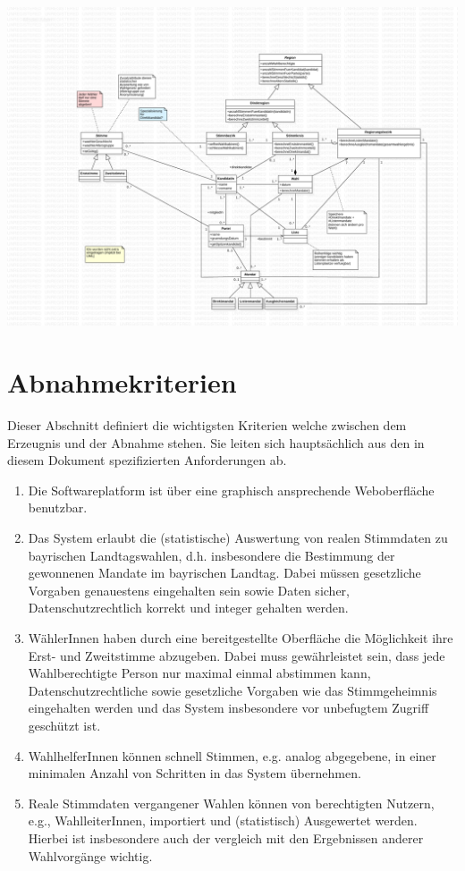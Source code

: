 \documentclass[a4paper,12pt]{article}
\begin{document}
\begin{center}
	\includegraphics[width=\textwidth]{../model.pdf}
\end{center}

\section{Abnahmekriterien}
Dieser Abschnitt definiert die wichtigsten Kriterien welche zwischen dem Erzeugnis und der Abnahme stehen.
Sie leiten sich hauptsächlich aus den in diesem Dokument spezifizierten Anforderungen ab.

\begin{enumerate}
  \item Die Softwareplatform ist über eine graphisch ansprechende Weboberfläche benutzbar.
  \item Das System erlaubt die (statistische) Auswertung von realen Stimmdaten zu bayrischen Landtagswahlen, d.h. 
        insbesondere die Bestimmung der gewonnenen Mandate im bayrischen Landtag. Dabei müssen gesetzliche
        Vorgaben genauestens eingehalten sein sowie Daten sicher, Datenschutzrechtlich korrekt und integer gehalten
        werden.
  \item WählerInnen haben durch eine bereitgestellte Oberfläche die Möglichkeit ihre Erst- und Zweitstimme abzugeben.
        Dabei muss gewährleistet sein, dass jede Wahlberechtigte Person nur maximal einmal abstimmen kann, 
        Datenschutzrechtliche sowie gesetzliche Vorgaben wie das Stimmgeheimnis eingehalten werden und das System 
        insbesondere vor unbefugtem Zugriff geschützt ist.
  \item WahlhelferInnen können schnell Stimmen, e.g. analog abgegebene, in einer minimalen Anzahl von Schritten in das
        System übernehmen.
  \item Reale Stimmdaten vergangener Wahlen können von berechtigten Nutzern, e.g., WahlleiterInnen, importiert und
        (statistisch) Ausgewertet werden. Hierbei ist insbesondere auch der vergleich mit den Ergebnissen anderer
        Wahlvorgänge wichtig.
\end{enumerate}
\end{document}
